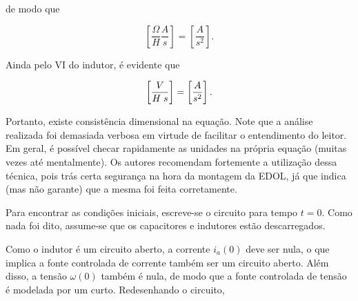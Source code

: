 \documentclass{article}
\numberwithin{equation}{section}
\let\l\left
\let\r\right
\let\dfr\dfrac
\begin{document}
\noindent de modo que

\begin{equation*}
    \l[\dfr{\Omega}{H} \dfr{A}{s}\r] = \l[ \dfr{A}{s^2} \r].
\end{equation*}

\noindent Ainda pelo VI do indutor, é evidente que

\begin{equation*}
    \l[\dfr{V}{H \hspace{1mm} s}\r] = \l[\dfr{A}{s^2}\r].
\end{equation*}

\noindent Portanto, existe consistência dimensional na equação. Note que a análise realizada foi demasiada verbosa em virtude de facilitar o entendimento do leitor. Em geral, é possível checar rapidamente as unidades na própria equação (muitas vezes até mentalmente). Os autores recomendam fortemente a utilização dessa técnica, pois trás certa segurança na hora da montagem da EDOL, já que indica (mas não garante) que a mesma foi feita corretamente.

\vspace{1cm}

\noindent Para encontrar as condições iniciais, escreve-se o circuito para tempo $t=0$. Como nada foi dito, assume-se que os capacitores e indutores estão descarregados.

\begin{center}
\end{center}

\noindent Como o indutor é um circuito aberto, a corrente $i_a(0)$ deve ser nula, o que implica a fonte controlada de corrente também ser um circuito aberto. Além disso, a tensão $\omega(0)$ também é nula, de modo que a fonte controlada de tensão é modelada por um curto. Redesenhando o circuito,

\begin{center}
\end{center}
\end{document}
